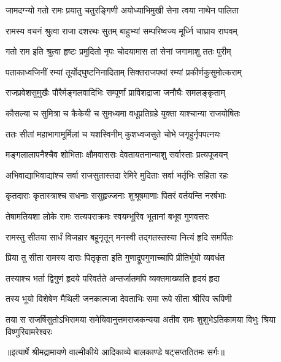 \twolineshloka
{जामदग्न्यो गतो रामः प्रयातु चतुरङ्गिणी}
{अयोध्याभिमुखी सेना त्वया नाथेन पालिता} %

\twolineshloka
{रामस्य वचनं श्रुत्वा राजा दशरथः सुतम्}
{बाहुभ्यां सम्परिष्वज्य मूर्ध्नि चाघ्राय राघवम्} %

\twolineshloka
{गतो राम इति श्रुत्वा हृष्टः प्रमुदितो नृपः}
{चोदयामास तां सेनां जगामाशु ततः पुरीम्} %

\twolineshloka
{पताकाध्वजिनीं रम्यां तूर्योद्घुष्टनिनादिताम्}
{सिक्तराजपथां रम्यां प्रकीर्णकुसुमोत्कराम्} %

\twolineshloka
{राजप्रवेशसुमुखैः पौरैर्मङ्गलवादिभिः}
{सम्पूर्णां प्राविशद्राजा जनौघैः समलङ्कृताम्} %

\twolineshloka
{कौसल्या च सुमित्रा च कैकेयी च सुमध्यमा}
{वधूप्रतिग्रहे युक्ता याश्चान्या राजयोषितः} %

\twolineshloka
{ततः सीतां महाभागामूर्मिलां च यशस्विनीम्}
{कुशध्वजसुते चोभे जगृहुर्नृपपत्नयः} %

\twolineshloka
{मङ्गलालापनैश्चैव शोभिताः क्षौमवाससः}
{देवतायतनान्याशु सर्वास्ताः प्रत्यपूजयन्} %

\twolineshloka
{अभिवाद्याभिवाद्यांश्च सर्वा राजसुतास्तदा}
{रेमिरे मुदिताः सर्वा भर्तृभिः सहिता रहः} %

\twolineshloka
{कृतदाराः कृतास्त्राश्च सधनाः ससुहृज्जनाः}
{शुश्रूषमाणाः पितरं वर्तयन्ति नरर्षभाः} %

\twolineshloka
{तेषामतियशा लोके रामः सत्यपराक्रमः}
{स्वयम्भूरिव भूतानां बभूव गुणवत्तरः} %

\twolineshloka
{रामस्तु सीतया सार्धं विजहार बहूनृतून्}
{मनस्वी तद्गतस्तस्या नित्यं हृदि समर्पितः} %

\twolineshloka
{प्रिया तु सीता रामस्य दाराः पितृकृता इति}
{गुणाद्रूपगुणाच्चापि प्रीतिर्भूयो व्यवर्धत} %

\twolineshloka
{तस्याश्च भर्ता द्विगुणं हृदये परिवर्तते}
{अन्तर्जातमपि व्यक्तमाख्याति हृदयं हृदा} %

\twolineshloka
{तस्य भूयो विशेषेण मैथिली जनकात्मजा}
{देवताभिः समा रूपे सीता श्रीरिव रूपिणी} %

\fourlineindentedshloka
{तया स राजर्षिसुतोऽभिरामया}
{समेयिवानुत्तमराजकन्यया}
{अतीव रामः शुशुभेऽतिकामया}
{विभुः श्रिया विष्णुरिवामरेश्वरः} %


{॥इत्यार्षे श्रीमद्रामायणे वाल्मीकीये आदिकाव्ये बालकाण्डे षट्सप्ततितमः सर्गः॥}

